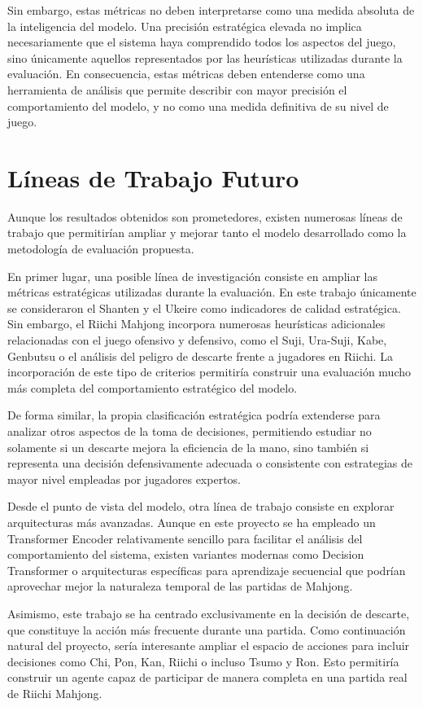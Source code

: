 Sin embargo, estas métricas no deben interpretarse como una medida absoluta de la inteligencia del modelo. Una precisión estratégica elevada no implica necesariamente que el sistema haya comprendido todos los aspectos del juego, sino únicamente aquellos representados por las heurísticas utilizadas durante la evaluación. En consecuencia, estas métricas deben entenderse como una herramienta de análisis que permite describir con mayor precisión el comportamiento del modelo, y no como una medida definitiva de su nivel de juego.

\section{Líneas de Trabajo Futuro}

Aunque los resultados obtenidos son prometedores, existen numerosas líneas de trabajo que permitirían ampliar y mejorar tanto el modelo desarrollado como la metodología de evaluación propuesta.

En primer lugar, una posible línea de investigación consiste en ampliar las métricas estratégicas utilizadas durante la evaluación. En este trabajo únicamente se consideraron el Shanten y el Ukeire como indicadores de calidad estratégica. Sin embargo, el Riichi Mahjong incorpora numerosas heurísticas adicionales relacionadas con el juego ofensivo y defensivo, como el Suji, Ura-Suji, Kabe, Genbutsu o el análisis del peligro de descarte frente a jugadores en Riichi. La incorporación de este tipo de criterios permitiría construir una evaluación mucho más completa del comportamiento estratégico del modelo.

De forma similar, la propia clasificación estratégica podría extenderse para analizar otros aspectos de la toma de decisiones, permitiendo estudiar no solamente si un descarte mejora la eficiencia de la mano, sino también si representa una decisión defensivamente adecuada o consistente con estrategias de mayor nivel empleadas por jugadores expertos.

Desde el punto de vista del modelo, otra línea de trabajo consiste en explorar arquitecturas más avanzadas. Aunque en este proyecto se ha empleado un Transformer Encoder relativamente sencillo para facilitar el análisis del comportamiento del sistema, existen variantes modernas como Decision Transformer o arquitecturas específicas para aprendizaje secuencial que podrían aprovechar mejor la naturaleza temporal de las partidas de Mahjong.

Asimismo, este trabajo se ha centrado exclusivamente en la decisión de descarte, que constituye la acción más frecuente durante una partida. Como continuación natural del proyecto, sería interesante ampliar el espacio de acciones para incluir decisiones como Chi, Pon, Kan, Riichi o incluso Tsumo y Ron. Esto permitiría construir un agente capaz de participar de manera completa en una partida real de Riichi Mahjong.


